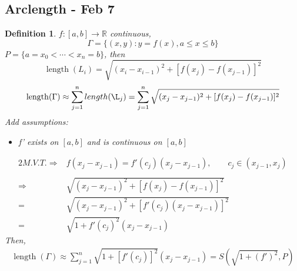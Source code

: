 \documentclass[12pt]{article}
\theoremstyle{plain}
\newtheorem{definition}{Definition}[subsection]
\newcommand{\mR}{{\mathbb{R}}}
\DeclareMathOperator{\Length}{length}
\begin{document}
{\begin{figure}[htbp]
	\centering
\end{figure}

%
}


\newpage
\subsection{Arclength - Feb 7}
\begin{definition}
	$f:[a,b]\to \mR$ continuous,
	\[
		\Gamma = \{(x,y): y = f(x), a\leq x \leq b\}
	\]
	$P = \{a = x_0 < \cdots < x_n = b\}$, then 
	\[
		\Length(L_i) = \sqrt{(x_i-x_{i-1})^2 + [f(x_j)-f(x_{j-1})]^2}
	\]
	\[
		\Length(\Gamma) \approx \sum_{j=1}^n length(\L_j) 
		=\sum_{j=1}^n \sqrt{(x_j-x_{j-1})^2 + [f(x_j)-f(x_{j-1})]^2}
	\]
	Add assumptions: 
	\begin{itemize}
		\item f' exists on $[a,b]$ and is continuous on $[a,b]$
	\end{itemize}
	
	\begin{alignat*}{2} 
		M.V.T.
		\Rightarrow &f(x_j-x_{j-1}) = f'(c_j) (x_j-x_{j-1}), \qquad
		c_j\in (x_{j-1}, x_j)\\\\
		\Rightarrow &\sqrt{(x_j-x_{j-1})^2 + [f(x_j)-f(x_{j-1})]^2}\\
			=& \sqrt{(x_j-x_{j-1})^2 + [f'(c_j)(x_j-x_{j-1})]^2}\\
			=& \sqrt{1+f'(c_j)^2}(x_j-x_{j-1})
	\end{alignat*}
	Then, 
	\begin{align*}
		\Length(\Gamma) \approx \sum_{j=1}^n \sqrt{1+[f'(c_j)]^2}
		(x_j-x_{j-1})= S(\sqrt{1+(f')^2}, P)
	\end{align*}
\end{definition}
\end{document}
